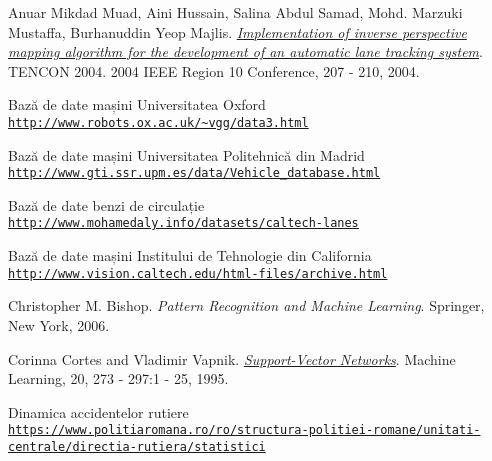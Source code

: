\begin{thebibliography}{9}
	
	\hypertarget{AnuarMikdadMuadAiniHussainSalinaAbdulSamadMohdMarzukiMustaffaBurhanuddinYeopMajlis}{} 
	Anuar Mikdad Muad, Aini Hussain, Salina Abdul Samad, Mohd. Marzuki Mustaffa, Burhanuddin Yeop Majlis.
	\textit{\href{http://ieeexplore.ieee.org/abstract/document/1414393/}{Implementation of inverse perspective mapping algorithm for the development of an automatic lane tracking system}}.
	TENCON 2004. 2004 IEEE Region 10 Conference, 207 - 210, 2004.
		
	\hypertarget{BazadedatemasiniUniversitateaOxford}{} 
	Bază de date mașini Universitatea Oxford
	\\\texttt{\url{http://www.robots.ox.ac.uk/~vgg/data3.html}}
	
	\hypertarget{BazadedatemasiniUniversitateaPolitehnicadinMadrid}{} 
	Bază de date mașini Universitatea Politehnică din Madrid
	\\\texttt{\url{http://www.gti.ssr.upm.es/data/Vehicle\_database.html}}
	
	\hypertarget{Bazadedatebenzidecirculatie}{} 
	Bază de date benzi de circulație
	\\\texttt{\url{http://www.mohamedaly.info/datasets/caltech-lanes}}
	
	\hypertarget{BazadedatemasiniInstituluideTehnologiedinCalifornia}{} 
	Bază de date mașini Institului de Tehnologie din California
	\\\texttt{\url{http://www.vision.caltech.edu/html-files/archive.html}}
	
	\hypertarget{ChristopherBishop}{} 
	Christopher M. Bishop. 
	\textit{Pattern Recognition and Machine Learning}. 
	Springer, New York, 2006.
	
	\hypertarget{CorinnaCortesVladimirVapnik}{} 
	Corinna Cortes and Vladimir Vapnik.
	\textit{\href{http://image.diku.dk/imagecanon/material/cortes_vapnik95.pdf}{Support-Vector Networks}}.
	Machine Learning, 20, 273 - 297:1 - 25, 1995.
	
	\hypertarget{Dinamicaaccidentelorrutiere}{}  
	Dinamica accidentelor rutiere
	\\\texttt{\url{https://www.politiaromana.ro/ro/structura-politiei-romane/unitati-centrale/directia-rutiera/statistici}}
		

\end{thebibliography}
